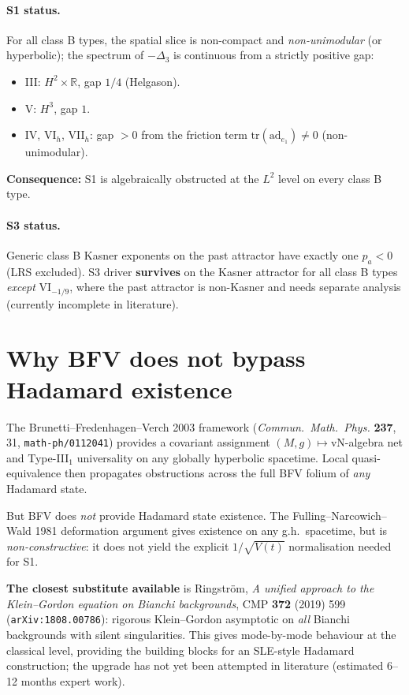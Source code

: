\documentclass[11pt,a4paper]{article}
\begin{document}
\paragraph{S1 status.} For all class B types, the spatial slice is
non-compact and \emph{non-unimodular} (or hyperbolic); the spectrum of
$-\Delta_3$ is continuous from a strictly positive gap:
\begin{itemize}
\item III: $H^2 \times \mathbb{R}$, gap $1/4$ (Helgason).
\item V: $H^3$, gap $1$.
\item IV, VI$_h$, VII$_h$: gap $> 0$ from the friction term
$\mathrm{tr}(\mathrm{ad}_{e_1}) \neq 0$ (non-unimodular).
\end{itemize}
\textbf{Consequence:} S1 is algebraically obstructed at the $L^2$ level on
every class B type.

\paragraph{S3 status.} Generic class B Kasner exponents on the past
attractor have exactly one $p_a < 0$ (LRS excluded). S3 driver
\textbf{survives} on the Kasner attractor for all class B types
\emph{except} VI$_{-1/9}$, where the past attractor is non-Kasner and
needs separate analysis (currently incomplete in literature).

\section{Why BFV does not bypass Hadamard existence}

The Brunetti--Fredenhagen--Verch 2003 framework
(\textit{Commun.\ Math.\ Phys.} \textbf{237}, 31, \texttt{math-ph/0112041})
provides a covariant assignment $(M,g) \mapsto \mathrm{vN}$-algebra net
and Type-III$_1$ universality on any globally hyperbolic spacetime. Local
quasi-equivalence then propagates obstructions across the full BFV folium
of \emph{any} Hadamard state.

But BFV does \emph{not} provide Hadamard state existence. The
Fulling--Narcowich--Wald 1981 deformation argument gives existence on any
g.h.\ spacetime, but is \emph{non-constructive}: it does not yield the
explicit $1/\sqrt{V(t)}$ normalisation needed for S1.

\textbf{The closest substitute available} is Ringström,
\textit{A unified approach to the Klein--Gordon equation on Bianchi
backgrounds}, CMP \textbf{372} (2019) 599 (\texttt{arXiv:1808.00786}):
rigorous Klein--Gordon asymptotic on \emph{all} Bianchi backgrounds with
silent singularities. This gives mode-by-mode behaviour at the classical
level, providing the building blocks for an SLE-style Hadamard
construction; the upgrade has not yet been attempted in literature
(estimated 6--12 months expert work).
\end{document}
